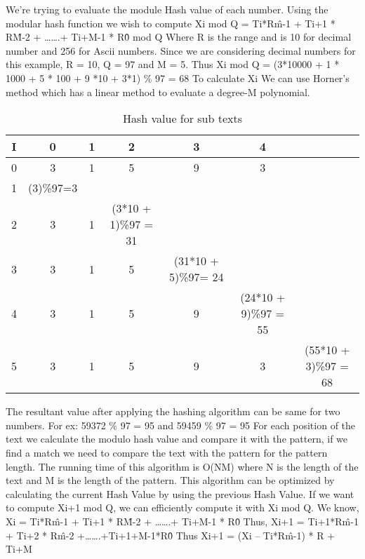 We’re trying to evaluate the module Hash value of each number.
Using the modular hash function we wish to compute
Xi mod Q = Ti*R\^m-1 + Ti+1 * R\^M-2 + …….+ Ti+M-1 * R\^0 mod Q
Where R is the range and is 10 for decimal number and 256 for Ascii numbers. Since we are considering decimal numbers for this example, R = 10, Q = 97 and M = 5.
Thus Xi mod Q = (3*10000 + 1 * 1000 + 5 * 100 + 9 *10 + 3*1) \% 97 = 68
To calculate Xi We can use Horner’s method which has a linear method to evaluate a degree-M polynomial.

\begin {table}[h]
\caption {Hash value for sub texts} \label{tab:title} 
\begin{tabular}{|c|c|c|c|c|c|c|} 
	\midrule
	I &  0 & 1 & 2 & 3 & 4\\
	\midrule
	0 & 3 & 1 & 5 & 9 & 3\\
	\midrule
	1 & (3)\%97=3 \\
	\midrule
	2 & 3 & 1 &  (3*10 + 1)\%97 = 31 \\
	\midrule
	3 & 3 & 1 & 5 &  (31*10 + 5)\%97= 24 \\
	\midrule
	4 & 3 & 1 & 5 & 9 & (24*10 + 9)\%97 = 55 \\
	\midrule
	5 & 3 & 1 & 5 & 9 & 3 & (55*10 + 3)\%97 = 68 \\
	\midrule
\end{tabular}
\end {table}

The resultant value after applying the hashing algorithm can be same for two numbers.
For ex: 59372 \% 97 = 95 and 59459 \% 97 = 95
For each position of the text we calculate the modulo hash value and compare it with the pattern, if we find a match we need to compare the text with the pattern for the pattern length.
The running time of this algorithm is O(NM) where N is the length of the text and M is the length of the pattern.
This algorithm can be optimized by calculating the current Hash Value by using the previous Hash Value.
If we want to compute Xi+1 mod Q, we can efficiently compute it with Xi mod Q.
We know, Xi = Ti*R\^m-1 + Ti+1 * R\^M-2 + …….+ Ti+M-1 * R\^0
Thus, Xi+1 = Ti+1*R\^m-1 + Ti+2 * R\^m-2 +…….+Ti+1+M-1*R\^0
Thus Xi+1 =  (Xi  – Ti*R\^m-1) * R  + Ti+M

